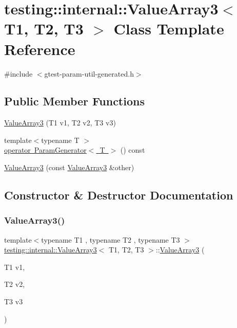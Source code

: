 \hypertarget{classtesting_1_1internal_1_1ValueArray3}{}\section{testing\+::internal\+::Value\+Array3$<$ T1, T2, T3 $>$ Class Template Reference}
\label{classtesting_1_1internal_1_1ValueArray3}


{\ttfamily \#include $<$gtest-\/param-\/util-\/generated.\+h$>$}

\subsection*{Public Member Functions}
\begin{DoxyCompactItemize}
\item 
\mbox{\hyperlink{classtesting_1_1internal_1_1ValueArray3_aa83b0671fed7a231ba127600c904246d}{Value\+Array3}} (T1 v1, T2 v2, T3 v3)
\item 
{\footnotesize template$<$typename T $>$ }\\\mbox{\hyperlink{classtesting_1_1internal_1_1ValueArray3_a4922d1cf7af801e82bdead15817b23fc}{operator Param\+Generator$<$ T $>$}} () const
\item 
\mbox{\hyperlink{classtesting_1_1internal_1_1ValueArray3_a742d8b00de6b63b020740ebbc7bc8d31}{Value\+Array3}} (const \mbox{\hyperlink{classtesting_1_1internal_1_1ValueArray3}{Value\+Array3}} \&other)
\end{DoxyCompactItemize}


\subsection{Constructor \& Destructor Documentation}
\mbox{\label{classtesting_1_1internal_1_1ValueArray3_aa83b0671fed7a231ba127600c904246d}} 
\subsubsection{\texorpdfstring{ValueArray3()}{ValueArray3()}\hspace{0.1cm}{\footnotesize\ttfamily [1/2]}}
{\footnotesize\ttfamily template$<$typename T1 , typename T2 , typename T3 $>$ \\
\mbox{\hyperlink{classtesting_1_1internal_1_1ValueArray3}{testing\+::internal\+::\+Value\+Array3}}$<$ T1, T2, T3 $>$\+::\mbox{\hyperlink{classtesting_1_1internal_1_1ValueArray3}{Value\+Array3}} (\begin{DoxyParamCaption}\item[{T1}]{v1,  }\item[{T2}]{v2,  }\item[{T3}]{v3 }\end{DoxyParamCaption})\hspace{0.3cm}{\ttfamily [inline]}}

